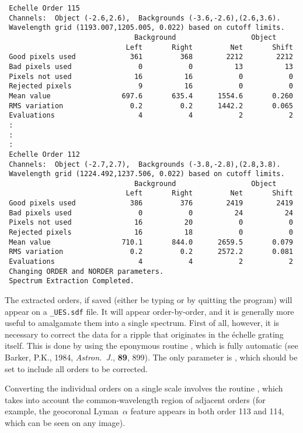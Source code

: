\begin{verbatim}
 Echelle Order 115
 Channels:  Object (-2.6,2.6),  Backgrounds (-3.6,-2.6),(2.6,3.6).
 Wavelength grid (1193.007,1205.005, 0.022) based on cutoff limits.
                               Background                  Object
                             Left       Right         Net       Shift
 Good pixels used             361         368        2212        2212
 Bad pixels used                0           0          13          13
 Pixels not used               16          16           0           0
 Rejected pixels                9          16           0           0
 Mean value                 697.6       635.4      1554.6       0.260
 RMS variation                0.2         0.2      1442.2       0.065
 Evaluations                    4           4           2           2
 :
 :
 :
 Echelle Order 112
 Channels:  Object (-2.7,2.7),  Backgrounds (-3.8,-2.8),(2.8,3.8).
 Wavelength grid (1224.492,1237.506, 0.022) based on cutoff limits.
                               Background                  Object
                             Left       Right         Net       Shift
 Good pixels used             386         376        2419        2419
 Bad pixels used                0           0          24          24
 Pixels not used               16          20           0           0
 Rejected pixels               16          18           0           0
 Mean value                 710.1       844.0      2659.5       0.079
 RMS variation                0.2         0.2      2572.2       0.081
 Evaluations                    4           4           2           2
 Changing ORDER and NORDER parameters.
 Spectrum Extraction Completed.
\end{verbatim}

The extracted orders, if saved (either be typing 
or by quitting
the program) will appear on a \verb+_UES.sdf+ file.  It will appear
order-by-order, and it is generally more useful to amalgamate them into a
single spectrum.  First of all, however, it is necessary to correct the data
for a ripple that originates in the \'{e}chelle grating itself.  This is done
by using the eponymous routine ,
which is fully automatic (see
Barker, P.K., 1984, {\it Astron.~J.}, {\bf 89}, 899).  The only parameter is
,
which should be set to include all orders to be corrected.

Converting the individual orders on a single scale involves the routine
,
which takes into account the common-wavelength region of adjacent
orders (for example, the geocoronal Lyman~$\alpha$ feature appears in both
order 113 and 114, which can be seen on any image).

